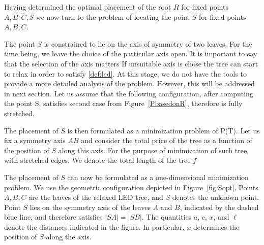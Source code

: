 \documentclass[openany]{book}
\newcommand{\Ptotal}[1]{P(#1)}
\begin{document}
		Having determined the optimal placement of the root \(R\) for fixed points \(A, B, C, S\) we now turn to the problem of locating the point \(S\) for fixed points \(A, B, C\).
		
		The point \(S\) is constrained to lie on the axis of symmetry of two leaves. For the time being, we leave the choice of the particular axis open. It is important to say that the selection of the axis matters If unsuitable axis is chose the tree can start to relax in order to satisfy \cref{def:led}. At this stage, we do not have the tools to provide a more detailed analysis of the problem. However, this will be addressed in next section. 
		Let us assume that the following configuration, after computing the point S, satisfies second case from Figure~\ref{PbasedonR}, therefore is fully stretched.

		The placement of \(S\) is then formulated as a minimization problem of \Ptotal{T}. 
		Let us fix a symmetry axis \(AB\) and consider the total price of the tree as a function of the position of \(S\) along this axis. 
		For the purpose of minimization of such tree, with stretched edges. We denote the total length of the tree \(f\)
		
		The placement of \(S\) can now be formulated as a one-dimensional minimization problem. We use the geometric configuration depicted in Figure~\ref{fig:Sopt}.
		Points \(A,B,C\) are the leaves of the relaxed LED tree, and \(S\) denotes the unknown point. 
		Point \(S\) lies on the symmetry axis of the leaves \(A\) and \(B\), indicated by the dashed blue line, and therefore satisfies \( |SA| = |SB| \).
		The quantities \(a\), \(c\), \(x\), and \(\ell\) denote the distances indicated	in the figure. In particular, \(x\) determines the position of \(S\) along the
		axis.
		
\end{document}
